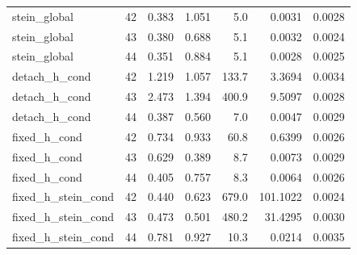 \documentclass[11pt,a4paper]{article}
\numberwithin{equation}{section}
\begin{document}
\begin{longtable}{p{4.25cm}rrrrrr}
stein\_global & 42 & 0.383 & 1.051 & 5.0 & 0.0031 & 0.0028 \\
stein\_global & 43 & 0.380 & 0.688 & 5.1 & 0.0032 & 0.0024 \\
stein\_global & 44 & 0.351 & 0.884 & 5.1 & 0.0028 & 0.0025 \\
detach\_h\_cond & 42 & 1.219 & 1.057 & 133.7 & 3.3694 & 0.0034 \\
detach\_h\_cond & 43 & 2.473 & 1.394 & 400.9 & 9.5097 & 0.0028 \\
detach\_h\_cond & 44 & 0.387 & 0.560 & 7.0 & 0.0047 & 0.0029 \\
fixed\_h\_cond & 42 & 0.734 & 0.933 & 60.8 & 0.6399 & 0.0026 \\
fixed\_h\_cond & 43 & 0.629 & 0.389 & 8.7 & 0.0073 & 0.0029 \\
fixed\_h\_cond & 44 & 0.405 & 0.757 & 8.3 & 0.0064 & 0.0026 \\
fixed\_h\_stein\_cond & 42 & 0.440 & 0.623 & 679.0 & 101.1022 & 0.0024 \\
fixed\_h\_stein\_cond & 43 & 0.473 & 0.501 & 480.2 & 31.4295 & 0.0030 \\
fixed\_h\_stein\_cond & 44 & 0.781 & 0.927 & 10.3 & 0.0214 & 0.0035 \\
\bottomrule\end{longtable}
\normalsize
\end{document}
